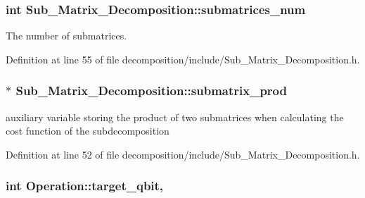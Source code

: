 \subsubsection[{\texorpdfstring{submatrices\+\_\+num}{submatrices_num}}]{\setlength{\rightskip}{0pt plus 5cm}int Sub\+\_\+\+Matrix\+\_\+\+Decomposition\+::submatrices\+\_\+num\hspace{0.3cm}{\ttfamily [protected]}}\hypertarget{class_sub___matrix___decomposition_a512831dd6b7f62fbfde10fb02dec3c5f}{}\label{class_sub___matrix___decomposition_a512831dd6b7f62fbfde10fb02dec3c5f}


The number of submatrices. 



Definition at line 55 of file decomposition/include/\+Sub\+\_\+\+Matrix\+\_\+\+Decomposition.\+h.

\subsubsection[{\texorpdfstring{submatrix\+\_\+prod}{submatrix_prod}}]{ $\ast$ Sub\+\_\+\+Matrix\+\_\+\+Decomposition\+::submatrix\+\_\+prod\hspace{0.3cm}{\ttfamily [protected]}}\hypertarget{class_sub___matrix___decomposition_a47dd88c6f311dc24a3e0fa695a2c490e}{}\label{class_sub___matrix___decomposition_a47dd88c6f311dc24a3e0fa695a2c490e}


auxiliary variable storing the product of two submatrices when calculating the cost function of the subdecomposition 



Definition at line 52 of file decomposition/include/\+Sub\+\_\+\+Matrix\+\_\+\+Decomposition.\+h.

\subsubsection[{\texorpdfstring{target\+\_\+qbit}{target_qbit}}]{\setlength{\rightskip}{0pt plus 5cm}int Operation\+::target\+\_\+qbit\hspace{0.3cm}{\ttfamily [protected]}, {\ttfamily [inherited]}}\hypertarget{class_operation_a3e489b72c124b494777c71b1646bb1e9}{}\label{class_operation_a3e489b72c124b494777c71b1646bb1e9}


